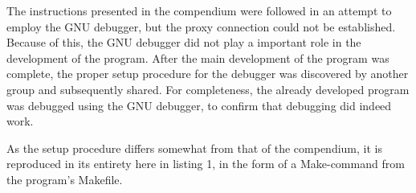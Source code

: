 The instructions presented in the compendium were followed in an attempt to employ the GNU debugger, but the proxy connection could not be established.
Because of this, the GNU debugger did not play a important role in the development of the program.
After the main development of the program was complete, the proper setup procedure for the debugger was discovered by another group and subsequently shared.
For completeness, the already developed program was debugged using the GNU debugger, to confirm that debugging did indeed work.

As the setup procedure differs somewhat from that of the compendium, it is reproduced in its entirety here in listing 1, in the form of a Make-command from the program's Makefile.


